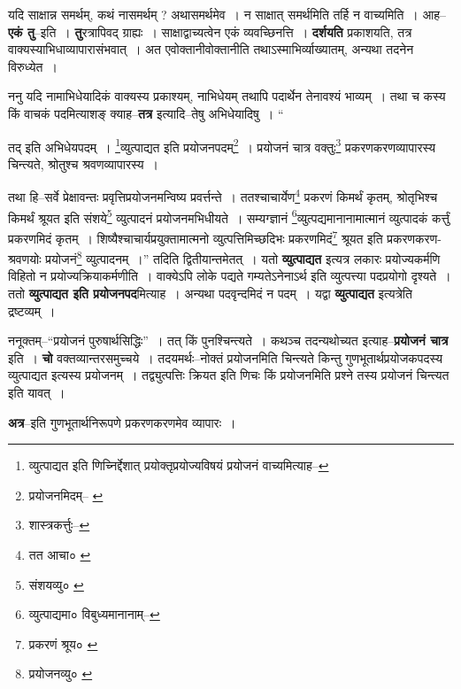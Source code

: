 \documentclass[article,12pt,a4paper]{memoir}
\begin{document}
	  \pstart यदि साक्षान्न समर्थम्, कथं नासमर्थम् ? अथासमर्थमेव । न साक्षात् समर्थमिति तर्हि न वाच्यमिति । आह--\textbf{एकं तु}--इति । \textbf{तु}रत्रापिवद् ग्राह्यः । साक्षाद्वाच्यत्वेन एकं व्यवच्छिनत्ति । \textbf{दर्शयति} प्रकाशयति, तत्र वाक्यस्याभिधाव्यापारासंभवात् । अत एवोक्तानीवोक्तानीति तथाऽस्माभिर्व्याख्यातम्, अन्यथा तदनेन विरुध्येत ।
	\pend
      

	  \pstart ननु यदि नामाभिधेयादिकं वाक्यस्य प्रकाश्यम्, नाभिधेयम् तथापि पदार्थेन तेनावश्यं भाव्यम् । तथा च कस्य किं वाचकं पदमित्याशङ् क्याह--\textbf{तत्र} इत्यादि--तेषु अभिधेयादिषु ।  \leavevmode{} “
	  
	तद् इति अभिधेयपदम् । \footnote{व्युत्पाद्यत इति णिच्निर्द्देशात् प्रयोक्तृप्रयोज्यविषयं प्रयोजनं वाच्यमित्याह--\cite{dp-msD-n}}व्युत्पाद्यत इति प्रयोजनपदम्\footnote{प्रयोजनमिदम्--\cite{dp-msA} \cite{dp-edP} \cite{dp-edH}} । प्रयोजनं चात्र वक्तुः\footnote{शास्त्रकर्त्तुः--\cite{dp-msD-n}} प्रकरणकरणव्यापारस्य चिन्त्यते, श्रोतुश्च श्रवणव्यापारस्य । 
	  
	तथा हि--सर्वे प्रेक्षावन्तः प्रवृत्तिप्रयोजनमन्विष्य प्रवर्त्तन्ते । ततश्चाचार्येण\footnote{तत आचा० \cite{dp-msA} \cite{dp-edP}} प्रकरणं किमर्थं कृतम्, श्रोतृभिश्च किमर्थं श्रूयत इति संशये\footnote{संशयव्यु० \cite{dp-edP} \cite{dp-edH}} व्युत्पादनं प्रयोजनमभिधीयते । सम्यग्ज्ञानं \footnote{व्युत्पाद्यमा० \cite{dp-msB} \cite{dp-edE} \cite{dp-edH} \cite{dp-edN} विबुध्यमानानाम्--\cite{dp-msD-n}}व्युत्पद्यमानानामात्मानं व्युत्पादकं कर्त्तुं प्रकरणमिदं कृतम् । शिष्यैश्चाचार्यप्रयुक्तामात्मनो व्युत्पत्तिमिच्छदिभः प्रकरणमिदं\footnote{प्रकरणं श्रूय० \cite{dp-msC} \cite{dp-msD} \cite{dp-msB}} श्रूयत इति प्रकरणकरण-श्रवणयोः प्रयोजनं\footnote{प्रयोजनव्यु० \cite{dp-edH} \cite{dp-edN}} व्युत्पादनम् ।” तदिति द्वितीयान्तमेतत् । यतो \textbf{व्युत्पाद्यत} इत्यत्र लकारः प्रयोज्यकर्मणि विहितो न प्रयोज्यक्रियाकर्मणीति । वाक्येऽपि लोके पद्यते गम्यतेऽनेनाऽर्थ इति व्युत्पत्त्या पदप्रयोगो दृश्यते । ततो \textbf{व्युत्पाद्यत इति प्रयोजनपद}मित्याह । अन्यथा पदवृन्दमिदं न पदम् । यद्वा \textbf{व्युत्पाद्यत} इत्यत्रेति द्रष्टव्यम् ।
	\pend
      

	  \pstart ननूक्तम्--“प्रयोजनं पुरुषार्थसिद्धिः” । तत् किं पुनश्चिन्त्यते । कथञ्च तदन्यथोच्यत इत्याह--\textbf{प्रयोजनं चात्र} इति । \textbf{चो} वक्तव्यान्तरसमुच्चये । तदयमर्थः--नोक्तं प्रयोजनमिति चिन्त्यते किन्तु गुणभूतार्थप्रयोजकपदस्य व्युत्पाद्यत इत्यस्य प्रयोजनम् । तद्व्युत्पत्तिः क्रियत इति णिचः किं प्रयोजनमिति प्रश्ने तस्य प्रयोजनं चिन्त्यत इति यावत् ।
	\pend
      

	  \pstart \textbf{अत्र}--इति गुणभूतार्थनिरूपणे प्रकरणकरणमेव व्यापारः ।
	\pend
      
\end{document}
